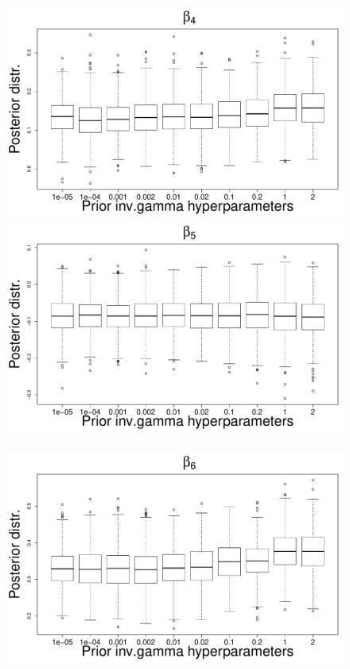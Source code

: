 \documentclass{statsoc}
\begin{document}
\begin{figure}
\includegraphics[scale=0.25]{Sensitivity/beta_4_sensitivity.pdf}\\
\includegraphics[scale=0.25]{Sensitivity/beta_5_sensitivity.pdf}~
\includegraphics[scale=0.25]{Sensitivity/beta_6_sensitivity.pdf}\\

\end{figure}
\end{document}
